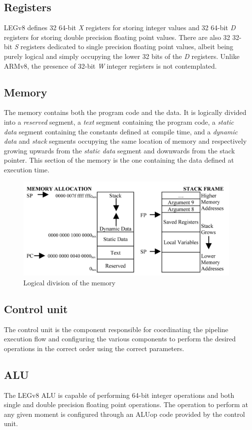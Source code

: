 \subsection*{Registers}
LEGv8 defines 32 64-bit \emph{X} registers for storing integer values and 32 64-bit \emph{D} registers for storing double precision floating point values. There are also 32 32-bit \emph{S} registers dedicated to single precision floating point values, albeit being purely logical and simply occupying the lower 32 bits of the \emph{D} registers. Unlike ARMv8, the presence of 32-bit \emph{W} integer registers is not contemplated.
\subsection*{Memory}
The memory contains both the program code and the data. It is logically divided into a \emph{reserved} segment, a \emph{text} segment containing the program code, a \emph{static data} segment containing the constants defined at compile time, and a \emph{dynamic data} and \emph{stack} segments occupying the same location of memory and respectively growing upwards from the \emph{static data} segment and downwards from the stack pointer. This section of the memory is the one containing the data defined at execution time.
\begin{figure}[H]
	\centering
	\includegraphics[width=.8\textwidth]{img/main_memory_layout.png}
	\caption{Logical division of the memory}
\end{figure}
\subsection*{Control unit}
The control unit is the component responsible for coordinating the pipeline execution flow and configuring the various components to perform the desired operations in the correct order using the correct parameters.
\subsection*{ALU}
The LEGv8 ALU is capable of performing 64-bit integer operations and both single and double precision floating point operations. The operation to perform at any given moment is configured through an ALUop code provided by the control unit.
